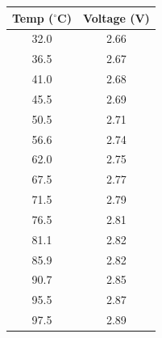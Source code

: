 \begin{tabular}{|c|c|}
    \hline
    \textbf{Temp ($^{\circ}$C)} & \textbf{Voltage (V)} \\
    \hline
    32.0 & 2.66 \\
    36.5 & 2.67 \\
    41.0 & 2.68 \\
    45.5 & 2.69 \\
    50.5 & 2.71 \\
    56.6 & 2.74 \\
    62.0 & 2.75 \\
    67.5 & 2.77 \\
    71.5 & 2.79 \\
    76.5 & 2.81 \\
    81.1 & 2.82 \\
    85.9 & 2.82 \\
    90.7 & 2.85 \\
    95.5 & 2.87 \\
    97.5 & 2.89 \\
    \hline
\end{tabular}
